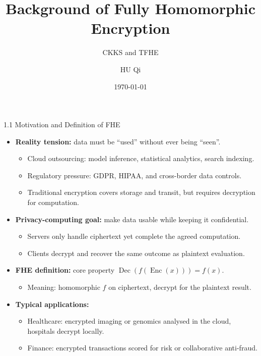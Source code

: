 \documentclass[aspectratio=169]{beamer}
\title{Background of Fully Homomorphic Encryption}
\subtitle{CKKS and TFHE}
\author{HU Qi}
\institute{The University of Hong Kong}
\date{\today}
\DeclareMathOperator{\Enc}{Enc}
\DeclareMathOperator{\Dec}{Dec}
\begin{document}
\begin{frame}[plain]
  \titlepage
{}
\end{frame}

\begin{frame}{1.1 Motivation and Definition of FHE}
  \begin{itemize}
    \item \textbf{Reality tension:} data must be ``used'' without ever being ``seen''.
    \begin{itemize}
      \item Cloud outsourcing: model inference, statistical analytics, search indexing.
      \item Regulatory pressure: GDPR, HIPAA, and cross-border data controls.
      \item Traditional encryption covers storage and transit, but requires decryption for computation.
    \end{itemize}
    \item \textbf{Privacy-computing goal:} make data usable while keeping it confidential.
    \begin{itemize}
      \item Servers only handle ciphertext yet complete the agreed computation.
      \item Clients decrypt and recover the same outcome as plaintext evaluation.
    \end{itemize}
    \item \textbf{FHE definition:} core property $\Dec(f(\Enc(x))) = f(x)$.
    \begin{itemize}
      \item Meaning: homomorphic $f$ on ciphertext, decrypt for the plaintext result.
    \end{itemize}
    \item \textbf{Typical applications:}
    \begin{itemize}
      \item Healthcare: encrypted imaging or genomics analysed in the cloud, hospitals decrypt locally.
      \item Finance: encrypted transactions scored for risk or collaborative anti-fraud.

\end{itemize}
\end{itemize}
\end{frame}
\end{document}
